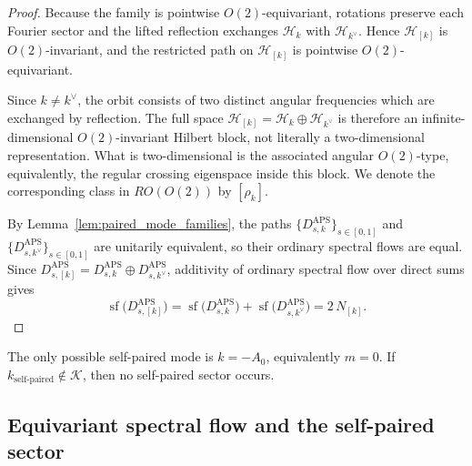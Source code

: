 \documentclass[11pt]{article}
\theoremstyle{definition}
\DeclareMathOperator{\APS}{APS}
\numberwithin{equation}{section}
\begin{document}
\begin{proof}
Because the family is pointwise \(O(2)\)-equivariant, rotations preserve each Fourier sector
and the lifted reflection exchanges \(\mathcal H_k\) with \(\mathcal H_{k^\vee}\). Hence
\(\mathcal H_{[k]}\) is \(O(2)\)-invariant, and the restricted path on
\(\mathcal H_{[k]}\) is pointwise \(O(2)\)-equivariant.

Since \(k\neq k^\vee\), the orbit consists of two distinct angular frequencies which are
exchanged by reflection. The full space \(\mathcal H_{[k]}=\mathcal H_k\oplus\mathcal H_{k^\vee}\)
is therefore an infinite-dimensional \(O(2)\)-invariant Hilbert block, not literally a
two-dimensional representation. What is two-dimensional is the associated angular
\(O(2)\)-type, equivalently, the regular crossing eigenspace inside this block. We denote the
corresponding class in \(RO(O(2))\) by \([\rho_{k}]\).



By Lemma~\ref{lem:paired_mode_families}, the paths
\(\{D_{s,k}^{\APS}\}_{s\in[0,1]}\) and \(\{D_{s,k^\vee}^{\APS}\}_{s\in[0,1]}\) are
unitarily equivalent, so their ordinary spectral flows are equal. Since \(D_{s,[k]}^{\APS} = D_{s,k}^{\APS}\oplus D_{s,k^\vee}^{\APS}\), additivity of ordinary spectral flow over direct sums gives
\begin{equation}\label{eq:orbit_block_sf_additivity_section6}
\operatorname{sf}\!\bigl(D_{s,[k]}^{\APS}\bigr)
=
\operatorname{sf}\!\bigl(D_{s,k}^{\APS}\bigr)
+
\operatorname{sf}\!\bigl(D_{s,k^\vee}^{\APS}\bigr)
=
2\,N_{[k]}.
\end{equation}
\end{proof}



The only possible self-paired mode is \(k=-A_0\), equivalently \(m=0\). If \(k_{\text{self-paired}}\notin\mathcal K\), then no self-paired sector occurs.

\subsection{Equivariant spectral flow and the self-paired sector}
\label{subsec:O2_sf_formula}
\end{document}

